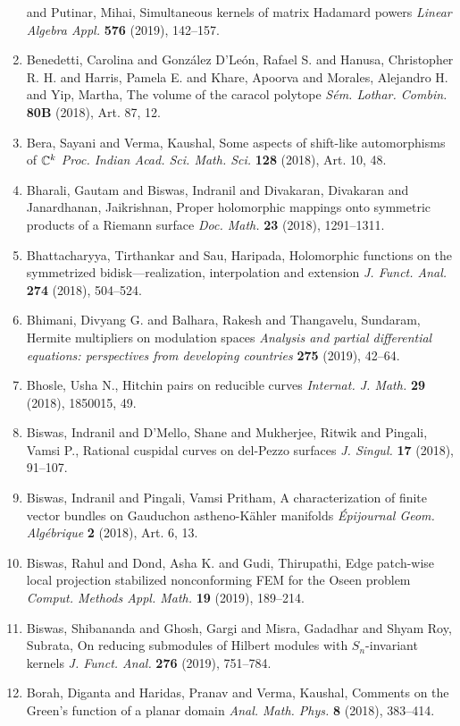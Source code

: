 \begin{enumerate}
and Putinar, Mihai, Simultaneous kernels of matrix {H}adamard powers {\em Linear Algebra Appl.} {\bf 576} (2019), 142--157.
\item Benedetti, Carolina and Gonz\'{a}lez D'Le\'{o}n, Rafael S. and Hanusa,
Christopher R. H. and Harris, Pamela E. and Khare, Apoorva and
Morales, Alejandro H. and Yip, Martha, The volume of the caracol polytope {\em S\'{e}m. Lothar. Combin.} {\bf 80B} (2018), Art. 87, 12.
\item Bera, Sayani and Verma, Kaushal, Some aspects of shift-like automorphisms of {$\Bbb C^k$} {\em Proc. Indian Acad. Sci. Math. Sci.} {\bf 128} (2018), Art. 10, 48.
\item Bharali, Gautam and Biswas, Indranil and Divakaran, Divakaran
and Janardhanan, Jaikrishnan, Proper holomorphic mappings onto symmetric products of a
{R}iemann surface {\em Doc. Math.} {\bf 23} (2018), 1291--1311.
\item Bhattacharyya, Tirthankar and Sau, Haripada, Holomorphic functions on the symmetrized bidisk---realization,
interpolation and extension {\em J. Funct. Anal.} {\bf 274} (2018), 504--524.
\item Bhimani, Divyang G. and Balhara, Rakesh and Thangavelu,
Sundaram, Hermite multipliers on modulation spaces {\em Analysis and partial differential equations: perspectives from
developing countries} {\bf 275} (2019), 42--64.
\item Bhosle, Usha N., Hitchin pairs on reducible curves {\em Internat. J. Math.} {\bf 29} (2018), 1850015, 49.
\item Biswas, Indranil and D'Mello, Shane and Mukherjee, Ritwik and
Pingali, Vamsi P., Rational cuspidal curves on del-{P}ezzo surfaces {\em J. Singul.} {\bf 17} (2018), 91--107.
\item Biswas, Indranil and Pingali, Vamsi Pritham, A characterization of finite vector bundles on {G}auduchon
astheno-{K}\"{a}hler manifolds {\em \'{E}pijournal Geom. Alg\'{e}brique} {\bf 2} (2018), Art. 6, 13.
\item Biswas, Rahul and Dond, Asha K. and Gudi, Thirupathi, Edge patch-wise local projection stabilized nonconforming
{FEM} for the {O}seen problem {\em Comput. Methods Appl. Math.} {\bf 19} (2019), 189--214.
\item Biswas, Shibananda and Ghosh, Gargi and Misra, Gadadhar and
Shyam Roy, Subrata, On reducing submodules of {H}ilbert modules with
{${S}_n$}-invariant kernels {\em J. Funct. Anal.} {\bf 276} (2019), 751--784.
\item Borah, Diganta and Haridas, Pranav and Verma, Kaushal, Comments on the {G}reen's function of a planar domain {\em Anal. Math. Phys.} {\bf 8} (2018), 383--414.

\end{enumerate}
